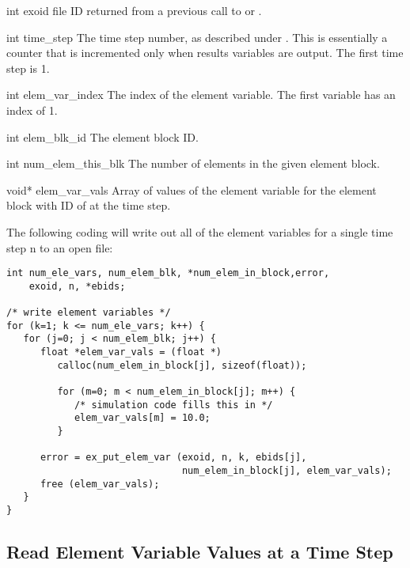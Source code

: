 \begin{parameters}
\item[{int exoid \R{}}]
\exo{} file ID returned from a previous call to  or
.

\item[{int time_step \R{}}]
The time step number, as described under . 
This is essentially a counter that is incremented only when results 
variables are output. The first time step is 1.

\item[{int elem_var_index \R{}}]
The index of the element variable. The first variable has 
an index of 1.

\item[{int elem_blk_id \R{}}]
The element block ID.

\item[{int num_elem_this_blk \R{}}]
The number of elements in the given element block.

\item[{void* elem_var_vals \R{}}]
Array of  values of the \th{} 
element variable for the element block with ID of  
at the \th{} time step.
\end{parameters}

The following coding will write out all of the element variables for a
single time step {n} to an open \exo{} file:

\begin{lstlisting}
int num_ele_vars, num_elem_blk, *num_elem_in_block,error, 
    exoid, n, *ebids;

/* write element variables */
for (k=1; k <= num_ele_vars; k++) {
   for (j=0; j < num_elem_blk; j++) {
      float *elem_var_vals = (float *)
         calloc(num_elem_in_block[j], sizeof(float));

         for (m=0; m < num_elem_in_block[j]; m++) {
            /* simulation code fills this in */
            elem_var_vals[m] = 10.0; 
         }

      error = ex_put_elem_var (exoid, n, k, ebids[j],
                               num_elem_in_block[j], elem_var_vals);
      free (elem_var_vals);
   }
}
\end{lstlisting}

\subsection{Read Element Variable Values at a Time Step}

